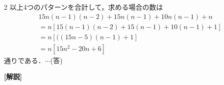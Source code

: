 \documentclass[../../../../main.tex]{subfiles}
\begin{document}
\begin{multicols}{2}
  \vspace{10pt}
  以上4つのパターンを合計して，求める場合の数は
  \begin{align*}
     & 15n(n-1)(n-2) + 15n(n-1) + 10n(n-1) + n   \\
     & = n[15(n-1)(n-2) + 15(n-1) + 10(n-1) + 1] \\
     & = n[((15n-5)(n-1) + 1]                    \\
     & = n[15n^2 - 20n + 6]
  \end{align*}
  通りである．$\cdots$(答)

  \vspace{10pt}
  {\bf[解説]}

  \newpage
\end{multicols}
\end{document}
